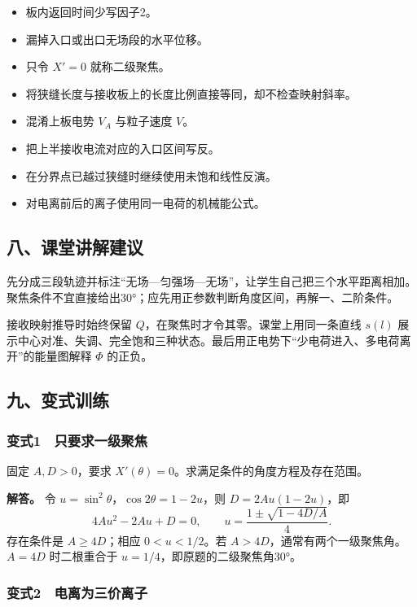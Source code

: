 \documentclass[12pt,a4paper,fontset=fandol]{ctexart}
\providecommand{\tightlist}{\setlength{\itemsep}{0pt}\setlength{\parskip}{0pt}}
\begin{document}
\begin{itemize}
\tightlist
\item
  板内返回时间少写因子2。
\item
  漏掉入口或出口无场段的水平位移。
\item
  只令 \(X'=0\) 就称二级聚焦。
\item
  将狭缝长度与接收板上的长度比例直接等同，却不检查映射斜率。
\item
  混淆上板电势 \(V_A\) 与粒子速度 \(V\)。
\item
  把上半接收电流对应的入口区间写反。
\item
  在分界点已越过狭缝时继续使用未饱和线性反演。
\item
  对电离前后的离子使用同一电荷的机械能公式。
\end{itemize}

\subsection{八、课堂讲解建议}\label{ux516bux8bfeux5802ux8bb2ux89e3ux5efaux8bae-1}

先分成三段轨迹并标注``无场---匀强场---无场''，让学生自己把三个水平距离相加。聚焦条件不宜直接给出30°；应先用正参数判断角度区间，再解一、二阶条件。

接收映射推导时始终保留 \(Q\)，在聚焦时才令其零。课堂上用同一条直线
\(s(l)\)
展示中心对准、失调、完全饱和三种状态。最后用正电势下``少电荷进入、多电荷离开''的能量图解释
\(\Phi\) 的正负。

\subsection{九、变式训练}\label{ux4e5dux53d8ux5f0fux8badux7ec3-1}

\subsubsection{变式1　只要求一级聚焦}\label{ux53d8ux5f0f1-ux53eaux8981ux6c42ux4e00ux7ea7ux805aux7126}

固定 \(A,D>0\)，要求 \(X'(\theta)=0\)。求满足条件的角度方程及存在范围。

\textbf{解答。} 令 \(u=\sin^2\theta\)，\(\cos2\theta=1-2u\)，则
\(D=2Au(1-2u)\)，即 \[
4Au^2-2Au+D=0,\qquad
u=\frac{1\pm\sqrt{1-4D/A}}4.
\] 存在条件是 \(A\ge4D\)；相应 \(0<u<1/2\)。若
\(A>4D\)，通常有两个一级聚焦角。\(A=4D\) 时二根重合于
\(u=1/4\)，即原题的二级聚焦角30°。

\subsubsection{变式2　电离为三价离子}\label{ux53d8ux5f0f2-ux7535ux79bbux4e3aux4e09ux4ef7ux79bbux5b50}
\end{document}
